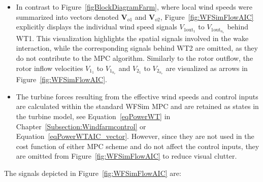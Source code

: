 \begin{itemize}
    \item In contrast to Figure~\ref{figBlockDiagramFarm}, where local wind speeds were summarized into vectors denoted $\bm{V}_{o1}$ and $\bm{V}_{o2}$, Figure~\ref{fig:WFSimFlowAIC} explicitly displays the individual wind speed signals $V_{1\text{out}_1}$ to $V_{1\text{out}_{n_r}}$ behind WT1. This visualization highlights the spatial signals involved in the wake interaction, while the corresponding signals behind WT2 are omitted, as they do not contribute to the MPC algorithm. Similarly to the rotor outflow, the rotor inflow velocities $V_{1_1}$ to $V_{1_{n_r}}$ and  $V_{2_1}$ to $V_{2_{n_r}}$ are visualized as arrows in Figure~\ref{fig:WFSimFlowAIC}.
    \item The turbine forces resulting from the effective wind speeds and control inputs are calculated within the standard WFSim MPC and are retained as states in the turbine model, see Equation~\eqref{eqPowerWT} in Chapter~\ref{Subsection:Windfarmcontrol} or Equation~\eqref{eqPowerWTAIC_vector}. However, since they are not used in the cost function of either MPC scheme and do not affect the control inputs, they are omitted from Figure~\ref{fig:WFSimFlowAIC} to reduce visual clutter.
\end{itemize}
%
The signals depicted in Figure~\ref{fig:WFSimFlowAIC} are:
